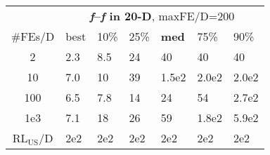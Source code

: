 \begin{tabular}{c|llllll}
 & \multicolumn{6}{|c}{\textbf{\textit{f}\raisebox{-0.35ex}{1}--\textit{f}\raisebox{-0.35ex}{24} in 20-D}, maxFE/D=200}\\
\#FEs/D & best & 10\% & 25\% & \textbf{med} & 75\% & 90\%\\
2 & \hspace*{1ex}2.3 & \hspace*{1ex}8.5 & 24 & 40 & 40 & 40\\
10 & \hspace*{1ex}7.0 & 10 & 39 & 1.5e2 & 2.0e2 & 2.0e2\\
100 & \hspace*{1ex}6.5 & \hspace*{1ex}7.8 & 14 & 24 & 54 & 2.7e2\\
1e3 & \hspace*{1ex}7.1 & 18 & 26 & 59 & 1.8e2 & 5.9e2\\
$\text{RL}_{\text{US}}$/D & 2e2 & 2e2 & 2e2 & 2e2 & 2e2 & 2e2
\end{tabular}
